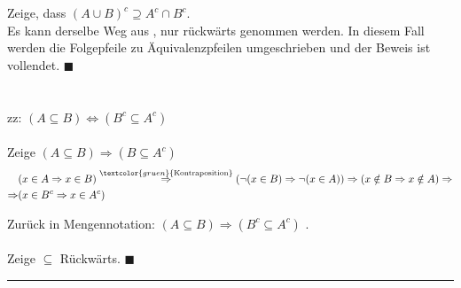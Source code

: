 \documentclass{article}
\newcommand{\comment}[1]{\textcolor{gruen}{\text{#1}}}
\begin{document}
{	\fbox{$\supseteq$} Zeige, dass $(A\cup B)^c \supseteq A^c \cap B^c$.\\
	Es kann derselbe Weg aus \fbox{$\subset$}, nur rückwärts genommen werden. In diesem Fall werden die Folgepfeile zu Äquivalenzpfeilen umgeschrieben und der Beweis ist vollendet. \hfill $\blacksquare$\\
	\\
	\\
	zz: $(A \subseteq B) \Leftrightarrow (B^c \subseteq A^c)$\\
	\\
	\fbox{$\subseteq$} Zeige $(A \subseteq B) \Rightarrow (B \subseteq A^c)$
		\begin{align*}
			&(x\in A \Rightarrow x\in B) \stackrel{\comment{Kontraposition}}{\Rightarrow} (\neg(x\in B) \Rightarrow \neg(x\in A)) \Rightarrow (x\notin B \Rightarrow x\notin A) \Rightarrow\\
			\Rightarrow &(x\in B^c\Rightarrow x\in A^c)
		\end{align*}
	
	Zurück in Mengennotation: $(A\subseteq B) \Rightarrow (B^c \subseteq A^c)$ \checkmark.\\
	\\
	\fbox{$\supseteq$} Zeige $\subseteq$ Rückwärts. \hfill $\blacksquare$
\hrule
}



\newpage
\end{document}
